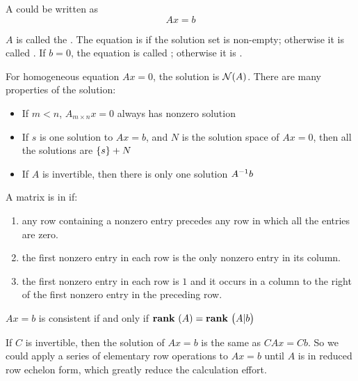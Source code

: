 A  could be written as 
\begin{equation}
    A x = b
\end{equation}

$A$ is called the . The equation is  if the solution set is non-empty; otherwise it is called . If $b=0$, the equation is called ; otherwise it is .

For homogeneous equation $Ax=0$, the solution is $\nullspace{A}$. There are many properties of the solution:
\begin{itemize}
    \item If $m < n$, $A_{m \times n} x = 0$ always has nonzero solution
    \item If $s$ is one solution to $Ax=b$, and $N$ is the solution space of $Ax=0$, then all the solutions are $\set{s} + N$
    \item If $A$ is invertible, then there is only one solution ${A}^{-1} b$
\end{itemize}




\begin{definition}
	A matrix is in  if:
	\begin{enumerate}
		\item any row containing a nonzero entry precedes any row in which all the entries are zero.
		\item the first nonzero entry in each row is the only nonzero entry in its column.
		\item the first nonzero entry in each row is $1$ and it occurs in a column to the right of the first nonzero entry in the preceding row.
	\end{enumerate}
\end{definition}


\begin{theorem}
    $Ax=b$ is consistent if and only if $\rank{A} = \rank{A|b}$
\end{theorem}

If $C$ is invertible, then the solution of $Ax=b$ is the same as $CAx=Cb$. So we could apply a series of elementary row operations to $Ax=b$ until $A$ is in reduced row echelon form, which greatly reduce the calculation effort. 






































